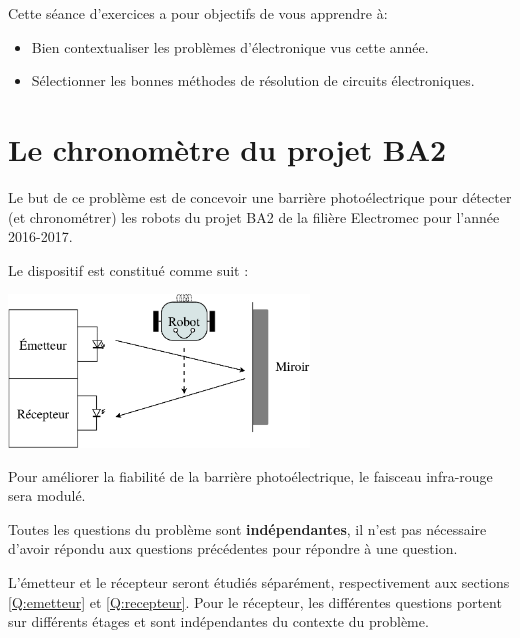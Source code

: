 \documentclass{../template/tp}
\author{The Fantastic Four}
\begin{document}


Cette séance d'exercices a pour objectifs de vous apprendre à:
\begin{itemize}
\item Bien contextualiser les problèmes d'électronique vus cette année.
\item Sélectionner les bonnes méthodes de résolution de circuits électroniques.
\end{itemize}




\section*{Le chronomètre du projet BA2}
Le but de ce problème est de concevoir une barrière photoélectrique pour détecter (et chronométrer) les robots du projet BA2 de la filière Electromec pour l'année 2016-2017.

Le dispositif est constitué comme suit :

\begin{center}
\includegraphics[width=8cm]{ER_ir-crop.pdf}
\end{center}

Pour améliorer la fiabilité de la barrière photoélectrique, le faisceau infra-rouge sera modulé.

Toutes les questions du problème sont \textbf{indépendantes}, il n'est pas nécessaire d'avoir répondu aux questions précédentes pour répondre à une question. 

L'émetteur et le récepteur seront étudiés séparément, respectivement aux sections \ref{Q:emetteur} et \ref{Q:recepteur}. Pour le récepteur, les différentes questions portent sur différents étages et sont indépendantes du contexte du problème.
\newpage
\end{document}
